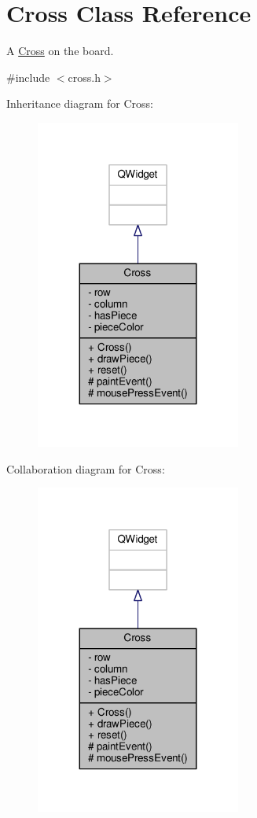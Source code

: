 \hypertarget{classCross}{}\section{Cross Class Reference}
\label{classCross}


A \hyperlink{classCross}{Cross} on the board.  




{\ttfamily \#include $<$cross.\+h$>$}



Inheritance diagram for Cross\+:
\nopagebreak
\begin{figure}[H]
\begin{center}
\leavevmode
\includegraphics[width=191pt]{classCross__inherit__graph}
\end{center}
\end{figure}


Collaboration diagram for Cross\+:
\nopagebreak
\begin{figure}[H]
\begin{center}
\leavevmode
\includegraphics[width=191pt]{classCross__coll__graph}
\end{center}
\end{figure}
